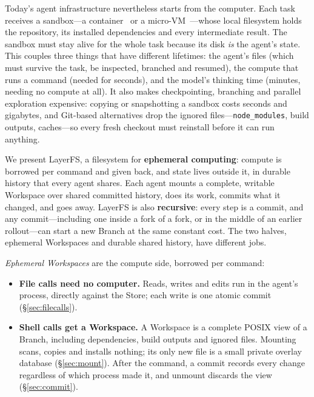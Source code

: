 \documentclass[letterpaper,twocolumn,10pt]{article}
\newcommand{\sys}{LayerFS}
\newcommand{\ws}{Workspace}
\begin{document}
Today's agent infrastructure nevertheless starts from the computer. Each
task receives a sandbox---a container~\cite{e2b} or a micro-VM~\cite{firecracker}---whose
local filesystem holds the repository, its installed dependencies and every
intermediate result. The sandbox must stay alive for the whole task because
its disk \emph{is} the agent's state. This couples three things that have
different lifetimes: the agent's files (which must survive the task, be
inspected, branched and resumed), the compute that runs a command (needed
for seconds), and the model's thinking time (minutes, needing no compute at
all). It also makes checkpointing, branching and parallel exploration
expensive: copying or snapshotting a sandbox costs seconds and gigabytes,
and Git-based alternatives drop the ignored files---\texttt{node\_modules},
build outputs, caches---so every fresh checkout must reinstall before it can
run anything.

We present \sys{}, a filesystem for \textbf{ephemeral computing}: compute
is borrowed per command and given back, and state lives outside it, in
durable history that every agent shares. Each agent mounts a complete,
writable \ws{} over shared committed history, does its work, commits what it
changed, and goes away. \sys{} is also \textbf{recursive}: every step is a
commit, and any commit---including one inside a fork of a fork, or in the
middle of an earlier rollout---can start a new Branch at the same constant
cost. The two halves, ephemeral \ws{}s and durable shared history, have
different jobs.

\emph{Ephemeral Workspaces} are the compute side, borrowed per command:
\begin{itemize}
\item \textbf{File calls need no computer.} Reads, writes and edits run in
  the agent's process, directly against the Store; each write is one atomic
  commit (\S\ref{sec:filecalls}).
\item \textbf{Shell calls get a \ws{}.} A \ws{} is a complete POSIX view of a
  Branch, including dependencies, build outputs and ignored files. Mounting
  scans, copies and installs nothing; its only new file is a small private
  overlay database (\S\ref{sec:mount}). After the command, a commit records
  every change regardless of which process made it, and unmount discards the
  view (\S\ref{sec:commit}).
\end{itemize}
\end{document}
